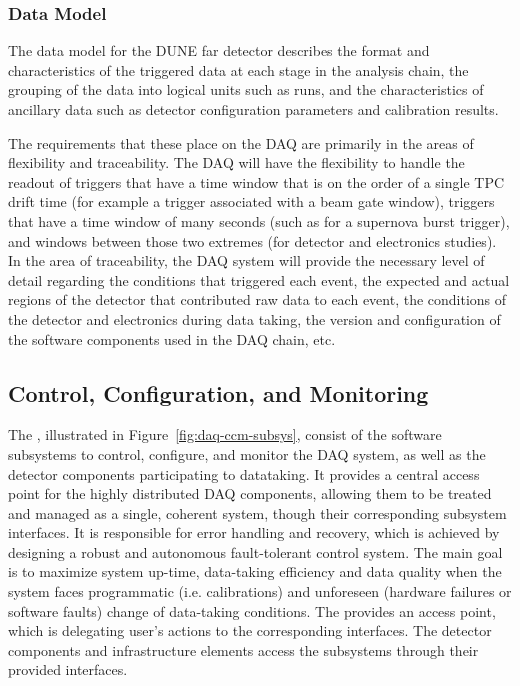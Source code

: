 \subsubsection{Data Model}
\label{sec:fd-daq:design-data-model}

The data model for the DUNE far detector describes the format and characteristics of the triggered data at each stage in the analysis chain, the grouping of the data into logical units such as runs, and the characteristics of ancillary data such as detector configuration parameters and calibration results.

The requirements that these place on the DAQ are primarily in the areas of flexibility and traceability.  The DAQ will have the flexibility to handle the readout of triggers that have a time window that is on the order of a single TPC drift time (for example a trigger associated with a beam gate window), triggers that have a time window of many seconds (such as for a supernova burst trigger), and windows between those two extremes (for detector and electronics studies).  In the area of traceability, the DAQ system will provide the necessary level of detail regarding the conditions that triggered each event, the expected and actual regions of the detector that contributed raw data to each event, the conditions of the detector and electronics during data taking, the version and configuration of the software components used in the DAQ chain, etc.

\subsection{Control, Configuration, and Monitoring}
\label{sec:fd-daq:design-run-control}

The , illustrated in Figure~\ref{fig:daq-ccm-subsys}, consist of the software
subsystems to control, configure, and monitor the DAQ system, as well as the detector components
participating to datataking. It provides a central access point for the highly distributed DAQ
components, allowing them to be treated and managed as a single, coherent system, though their
corresponding subsystem interfaces. It is responsible for error handling and recovery, which is
achieved by designing a robust and autonomous fault-tolerant control system. The main goal is to
maximize system up-time, data-taking efficiency and data quality when the system faces programmatic
(i.e. calibrations) and unforeseen (hardware failures or software faults) change of data-taking
conditions. The  provides an access point, which is delegating user’s actions to the
corresponding interfaces. The detector components and infrastructure elements access the 
subsystems through their provided interfaces. 

